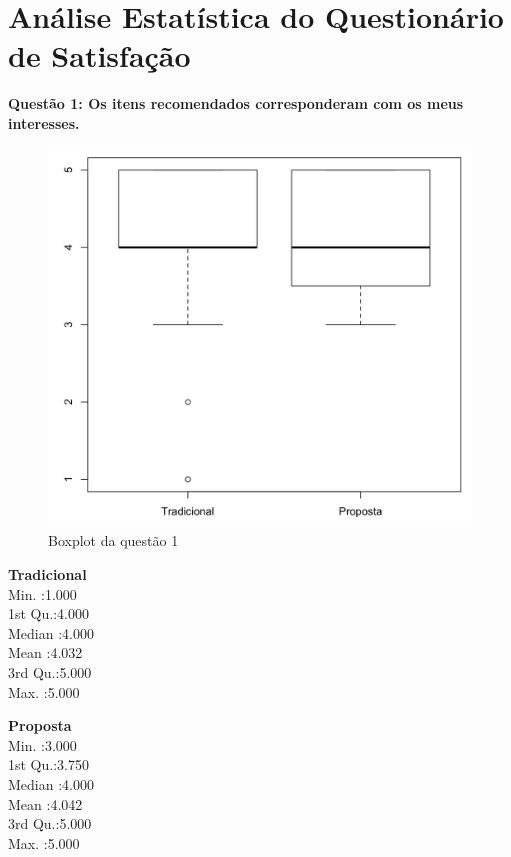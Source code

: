 \chapter{Análise Estatística do Questionário de Satisfação}\label{ape:analise-estatistica-questionario}

\textbf{Questão 1: Os itens recomendados corresponderam com os meus interesses.}

\begin{figure}[htb]
  \caption{\label{fig:questao1-boxplot}Boxplot da questão 1}
  \begin{center}
      \includegraphics[scale=0.4]{./Figuras/questao1-boxplot.png}
  \end{center}
\end{figure}

\begin{multicols}{2}

\noindent\textbf{Tradicional}\\
Min.   :1.000\\
1st Qu.:4.000\\
Median :4.000\\
Mean   :4.032\\
3rd Qu.:5.000\\
Max.   :5.000\\
\columnbreak

\noindent\textbf{Proposta}\\
Min.   :3.000\\
1st Qu.:3.750\\
Median :4.000\\
Mean   :4.042\\
3rd Qu.:5.000\\
Max.   :5.000
\end{multicols}

